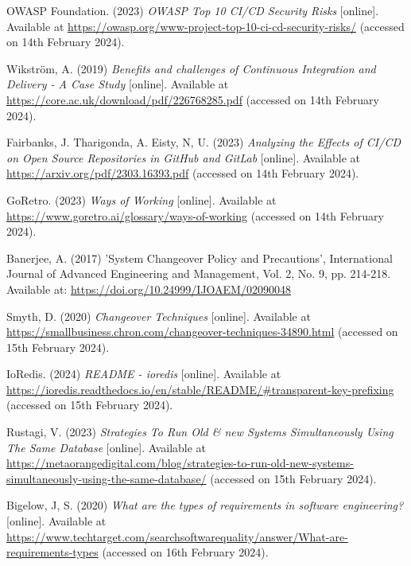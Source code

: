 \noindent OWASP Foundation. (2023) \textit{OWASP Top 10 CI/CD Security Risks} [online]. Available at \url{https://owasp.org/www-project-top-10-ci-cd-security-risks/} (accessed on 14th February 2024).
\vspace{0.2cm}

\noindent Wikström, A. (2019) \textit{Benefits and challenges of Continuous Integration and Delivery - A Case Study} [online]. Available at \url{https://core.ac.uk/download/pdf/226768285.pdf} (accessed on 14th February 2024).
\vspace{0.2cm}

\noindent Fairbanks, J. Tharigonda, A. Eisty, N, U. (2023) \textit{Analyzing the Effects of CI/CD on Open Source Repositories in GitHub and GitLab} [online]. Available at \url{https://arxiv.org/pdf/2303.16393.pdf} (accessed on 14th February 2024).
\vspace{0.2cm}

\noindent GoRetro. (2023) \textit{Ways of Working} [online]. Available at \url{https://www.goretro.ai/glossary/ways-of-working} (accessed on 14th February 2024).
\vspace{0.2cm}

\noindent Banerjee, A. (2017) 'System Changeover Policy and Precautions', International Journal of Advanced Engineering and Management, Vol. 2, No. 9, pp. 214-218. Available at: \url{https://doi.org/10.24999/IJOAEM/02090048}
\vspace{0.2cm}

\noindent Smyth, D. (2020) \textit{Changeover Techniques} [online]. Available at \url{https://smallbusiness.chron.com/changeover-techniques-34890.html} (accessed on 15th February 2024).
\vspace{0.2cm}

\noindent IoRedis. (2024) \textit{README - ioredis} [online]. Available at \url{https://ioredis.readthedocs.io/en/stable/README/#transparent-key-prefixing} (accessed on 15th February 2024).
\vspace{0.2cm}

\noindent Rustagi, V. (2023) \textit{Strategies To Run Old \& new Systems Simultaneously Using The Same Database} [online]. Available at \url{https://metaorangedigital.com/blog/strategies-to-run-old-new-systems-simultaneously-using-the-same-database/} (accessed on 15th February 2024).
\vspace{0.2cm}

\noindent Bigelow, J, S. (2020) \textit{What are the types of requirements in software engineering?} [online]. Available at \url{https://www.techtarget.com/searchsoftwarequality/answer/What-are-requirements-types} (accessed on 16th February 2024).
\vspace{0.2cm}

